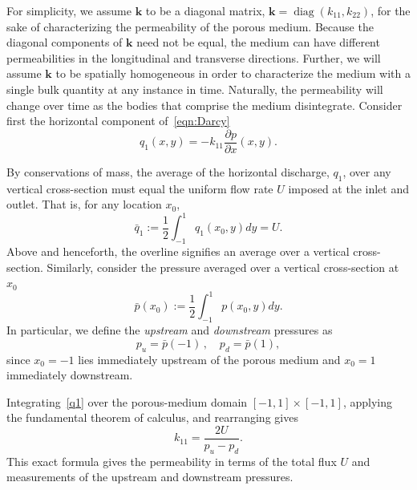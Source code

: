 \documentclass[3p]{elsarticle}
\newcommand{\pderiv}[2]{\frac{\partial #1}{\partial #2}}
\newcommand{\bvec}[1]{\mathbf{#1}}
\newcommand{\qavg}{\bar{q}}
\newcommand{\pavg}{\bar{p}}
\newcommand{\pup}{p_u}
\newcommand{\pdn}{p_d}
\newcommand{\diag}{\mathop{\mathrm{diag}}}
\begin{document}

For simplicity, we assume $\bvec{k}$ to be a diagonal matrix, $\bvec{k}
= \diag(k_{11}, k_{22})$, for the sake of characterizing the
permeability of the porous medium. Because the diagonal components of
$\bvec{k}$ need not be equal, the medium can have different
permeabilities in the longitudinal and transverse directions. Further,
we will assume $\bvec{k}$ to be spatially homogeneous in order to
characterize the medium with a single bulk quantity at any instance in
time. Naturally, the permeability will change over time as the bodies
that comprise the medium disintegrate. Consider first the horizontal
component of~\eqref{eqn:Darcy}
\begin{equation}
  \label{q1}
  q_1(x,y) = -k_{11} \pderiv{p}{x}(x,y).
\end{equation}

By conservations of mass, the average of the horizontal discharge, $q_1$, over any vertical cross-section must equal the uniform flow rate $U$ imposed at the inlet and outlet. That is, for any location $x_0$,
\begin{equation}
\qavg_1 := \frac{1}{2} \int_{-1}^{1} q_1(x_0, y) dy = U.
\end{equation}
Above and henceforth, the overline signifies an average over a vertical cross-section. Similarly, consider the pressure averaged over a vertical cross-section at $x_0$
\begin{equation}
  \pavg(x_0) := \frac{1}{2} \int_{-1}^{1} p(x_0, y) dy.
\end{equation}
In particular, we define the {\em upstream} and {\em downstream} pressures as
\begin{equation}
  \pup = \pavg(-1) \, , \quad \pdn = \pavg(1),
\end{equation}
since $x_0 = -1$ lies immediately upstream of the porous medium and $x_0 = 1$ immediately downstream.

Integrating~\eqref{q1} over the porous-medium domain $[-1, 1] \times [-1,1]$, applying the fundamental theorem of calculus, and rearranging gives
\begin{equation}
  \label{eqn:k11}
  k_{11} = \frac{2U}{\pup - \pdn}.
\end{equation}
This exact formula gives the permeability in terms of the total flux $U$
and measurements of the upstream and downstream pressures.
\end{document}
